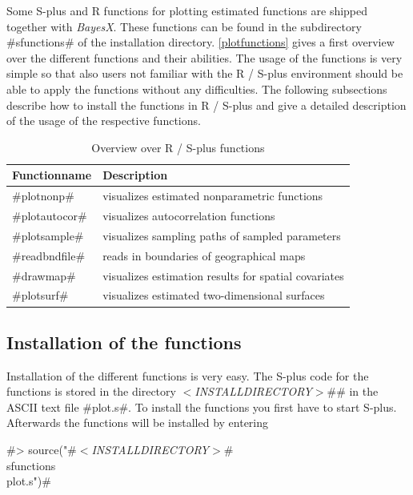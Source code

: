 Some S-plus and R functions for plotting estimated functions are
shipped together with {\em BayesX}. These functions can be found in
the subdirectory #sfunctions# of the installation directory.
\autoref{plotfunctions} gives a first overview over the different
functions and their abilities. The usage of the functions is very
simple so that also users not familiar with the R / S-plus
environment should be able to apply the functions without any
difficulties. The following subsections describe how to install the
functions in R / S-plus and give a detailed description of the usage
of the respective functions.

\begin{table}[ht]
\begin{center}
\begin{tabular}{|l|l|}
\hline
{\bf Functionname} & {\bf Description} \\
\hline
#plotnonp# & visualizes estimated nonparametric functions \\
#plotautocor# & visualizes autocorrelation functions \\
#plotsample# & visualizes sampling paths of sampled parameters \\
#readbndfile# & reads in boundaries of geographical maps \\
#drawmap# & visualizes estimation results for spatial covariates \\
#plotsurf# & visualizes estimated two-dimensional surfaces \\
\hline
\end{tabular}
{\em\caption{\label{plotfunctions} Overview over R / S-plus
functions}}
\end{center}
\end{table}


\subsection{Installation of the functions} 

Installation of the different functions is very easy. The S-plus
code for the functions is stored in the directory {\em
$<$INSTALLDIRECTORY$>$}#\sfunctions# in the ASCII text file
#plot.s#. To install the functions you first have to start S-plus.
Afterwards the functions will be installed by entering

#> source("#{\em $<$INSTALLDIRECTORY$>$}#\\sfunctions\\plot.s")#

